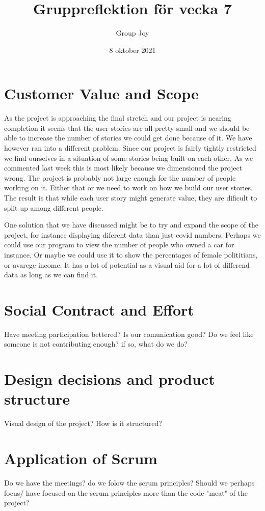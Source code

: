 \documentclass{scrartcl}
\begin{document}
\title{Gruppreflektion för vecka 7}
\author{Group Joy}
\date{8 oktober 2021}
\maketitle

\section{Customer Value and Scope}
As the project is approaching the final stretch and our project is nearing completion it seems that the user stories are all pretty small and we should be able to increase the number of stories we could get done because of it. We have however ran into a different problem. Since our project is fairly tightly restricted we find ourselves in a situation of some stories being built on each other. As we commented last week this is most likely because we dimensioned the project wrong. The project is probably not large enough for the number of people working on it. Either that or we need to work on how we build our user stories. The result is that while each user story might generate value, they are dificult to split up among different people. 

One solution that we have discussed might be to try and expand the scope of the project, for instance displaying diferent data than just covid numbers. Perhaps we could use our program to view the number of people who owned a car for instance. Or maybe we could use it to show the percentages of female polititians, or avarege income. It has a lot of potential as a visual aid for a lot of differend data as long as we can find it. 


\section{Social Contract and Effort}
Have meeting participation bettered? 
Is our comunication good? 
Do we feel like someone is not contributing enough? if so, what do we do?

\section{Design decisions and product structure}
Visual design of the project? 
How is it structured? 

\section{Application of Scrum}
Do we have the meetings? 
do we folow the scrum principles? 
Should we perhaps focus/ have focused on the scrum principles more than the code "meat" of the project?
\end{document}
